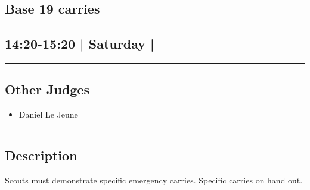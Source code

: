 \documentclass[10pt, A5]{article}
\begin{document}
	

		\begin{framed}
			\begin{minipage}{\textwidth}

			\setcounter{section}{48}
							\section{\faStar \: Base 19 \faStar \: carries}
						
			\subsection*{14:20-15:20 | Saturday | }

			\vspace{0.25cm}
			\hrule
			\vspace{0.25cm}


			\subsection*{Other Judges}
							

				\begin{multicols}{2}

			\begin{itemize}
											\item Daniel Le Jeune
								\end{itemize}

			\vfill\null
			\columnbreak

			\begin{itemize}
								\end{itemize}

			\vfill\null

			\end{multicols}

			\vspace{0.25cm}
			\hrule
			\vspace{0.25cm}

			\begin{minipage}{\textwidth}
			\subsection*{\faListAlt \: Description}
			Scouts must demonstrate specific emergency carries. Specific carries on hand out.
			\end{minipage}


	\end{minipage}
	\end{framed}
\end{document}
